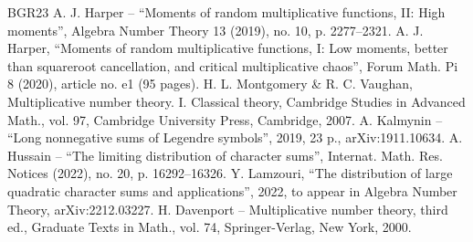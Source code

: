 \documentclass[10pt]{amsart}
\theoremstyle{plain}
\theoremstyle{definition}
\begin{document}
\begin{thebibliography}{BGR23}
 A. J. Harper – “Moments of random multiplicative functions, II: High moments”, Algebra Number Theory 13 (2019), no. 10, p. 2277–2321.
 A. J. Harper, “Moments of random multiplicative functions, I: Low moments, better than squareroot cancellation, and critical multiplicative chaos”, Forum Math. Pi 8 (2020), article no. e1 (95 pages).
 H. L. Montgomery \& R. C. Vaughan, Multiplicative number theory. I. Classical theory, Cambridge Studies in Advanced Math., vol. 97, Cambridge University Press, Cambridge, 2007.
 A. Kalmynin – “Long nonnegative sums of Legendre symbols”, 2019, 23 p., arXiv:1911.10634.
 A. Hussain – “The limiting distribution of character sums”, Internat. Math. Res. Notices (2022), no. 20, p. 16292–16326.
 Y. Lamzouri, “The distribution of large quadratic character sums and applications”, 2022, to appear in Algebra Number Theory, arXiv:2212.03227.
 H. Davenport – Multiplicative number theory, third ed., Graduate Texts in Math., vol. 74, Springer-Verlag, New York, 2000.
\end{thebibliography}
\end{document}
